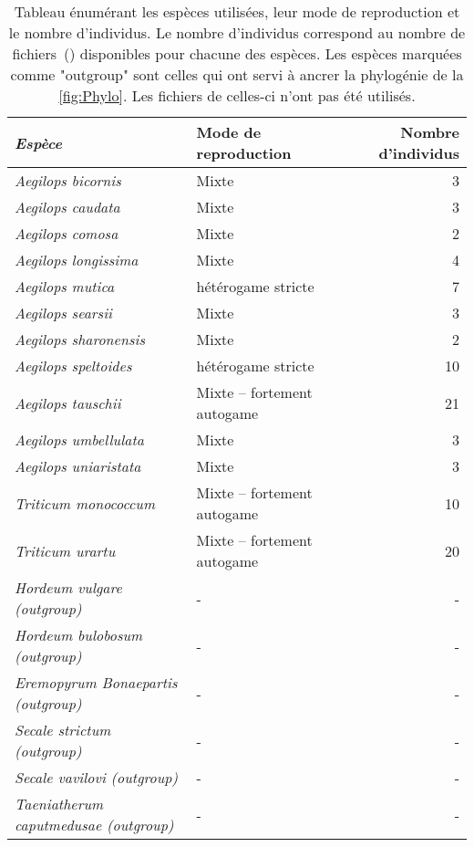 \documentclass[../main]{subfiles} %
\begin{document}
\addto\extrasfrench{\protected\edef:{\unexpanded\expandafter{:}}}

\begin{table}[ht]
    \centering
    \begin{tabular}{>{\itshape}l l r}
        \toprule
        Espèce & Mode de reproduction & Nombre d’individus \\
        \midrule
        Aegilops bicornis & Mixte & 3 \\
        Aegilops caudata & Mixte & 3 \\
        Aegilops comosa & Mixte & 2 \\
        Aegilops longissima & Mixte & 4 \\
        Aegilops mutica & \Gls{hétérogame}  stricte & 7 \\
        Aegilops searsii & Mixte & 3 \\
        Aegilops sharonensis & Mixte & 2 \\
        Aegilops speltoides & \Gls{hétérogame}  stricte & 10 \\
        Aegilops tauschii & Mixte – fortement \gls{autogame} & 21 \\
        Aegilops umbellulata & Mixte & 3 \\
        Aegilops uniaristata & Mixte & 3 \\
        Triticum monococcum & Mixte – fortement \gls{autogame} & 10 \\
        Triticum urartu & Mixte – fortement \gls{autogame} & 20 \\

        Hordeum vulgare (\gls{outgroup}) & - & - \\
        Hordeum bulobosum (\gls{outgroup})  & - & - \\
        Eremopyrum Bonaepartis (\gls{outgroup}) & - & - \\
        Secale strictum (\gls{outgroup}) & - & - \\
        Secale vavilovi (\gls{outgroup}) & - & - \\
        Taeniatherum caputmedusae (\gls{outgroup}) & - & - \\
        \bottomrule

        
    \end{tabular}
    \caption{Tableau énumérant les espèces utilisées, leur mode de reproduction et le nombre d'individus. Le nombre d'individus correspond au nombre de fichiers \bam\,(\OldBam) disponibles pour chacune des espèces. Les espèces marquées comme "\gls{outgroup}" sont celles qui ont servi à ancrer la phylogénie de la \cref{fig:Phylo}. Les fichiers \bam de celles-ci n'ont pas été utilisés.
    \label{tab:Especes}
    }

    
\end{table}

\end{document}
